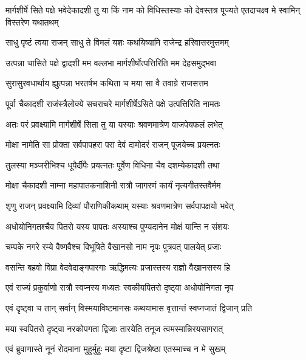 \threelineshloka
{मार्गशीर्षे सिते पक्षे भवेदेकादशी तु या}
{किं नाम को विधिस्तस्याः को देवस्तत्र पूज्यते}
{एतदाचक्ष्व मे स्वामिन् विस्तरेण यथातथम्}%


\twolineshloka
{साधु पृष्टं त्वया राजन् साधु ते विमलं यशः}
{कथयिष्यामि राजेन्द्र हरिवासरमुत्तमम्}%

\twolineshloka
{उत्पन्ना चासिते पक्षे द्वादशी मम वल्लभा}
{मार्गशीर्षोत्पत्तिरिति मम देहसमुद्भवा}%

\twolineshloka
{सुरासुरवधार्थाय ह्युत्पन्ना भरतर्षभ}
{कथिता च मया सा वै तवाग्रे राजसत्तम}%

\twolineshloka
{पूर्वा चैकादशी राजंस्त्रैलोक्ये सचराचरे}
{मार्गशीर्षेऽसिते पक्षे उत्पत्तिरिति नामतः}%

\twolineshloka
{अतः परं प्रवक्ष्यामि मार्गशीर्षे सिता तु या}
{यस्याः श्रवणमात्रेण वाजपेयफलं लभेत्}%

\twolineshloka
{मोक्षा नामेति सा प्रोक्ता सर्वपापहरा परा}
{देवं दामोदरं राजन् पूजयेच्च प्रयत्नतः}%

\twolineshloka
{तुलस्या मञ्जरीभिश्च धूपैर्दीपैः प्रयत्नतः}
{पूर्वेण विधिना चैव दशम्येकादशी तथा}%

\twolineshloka
{मोक्षा चैकादशी नाम्ना महापातकनाशिनी}
{रात्रौ जागरणं कार्यं नृत्यगीतस्तवैर्मम}%

\twolineshloka
{शृणु राजन् प्रवक्ष्यामि दिव्यां पौराणिकीकथाम्}
{यस्याः श्रवणमात्रेण सर्वपापक्षयो भवेत्}%

\twolineshloka
{अधोयोनिगतश्चैव पितरो यस्य पापतः}
{अस्याश्च पुण्यदानेन मोक्षं यान्ति न संशयः}%

\twolineshloka
{चम्पके नगरे रम्ये वैष्णवैश्च विभूषिते}
{वैखानसो नाम नृपः पुत्रवत् पालयेत् प्रजाः}%

\twolineshloka
{वसन्ति बहवो विप्रा वेदवेदाङ्गपारगाः}
{ऋद्धिमत्यः प्रजास्तस्य राज्ञो वैखानसस्य हि}%

\twolineshloka
{एवं राज्यं प्रकुर्वाणो रात्रौ स्वप्नस्य मध्यतः}
{स्वकीयपितरो दृष्ट्वा अधोयोनिगता नृप}%

\twolineshloka
{एवं दृष्ट्वा च तान् सर्वान् विस्मयाविष्टमानसः}
{कथयामास वृत्तान्तं स्वप्नजातं द्विजान् प्रति}%


\twolineshloka
{मया स्वपितरो दृष्ट्वा नरकोपगता द्विजाः}
{तारयेति तनूज त्वमस्मान्निरयसागरात्}%

\twolineshloka
{एवं ब्रुवाणास्ते नूनं रोदमाना मुहुर्मुहुः}
{मया दृष्टा द्विजश्रेष्ठा एतस्माच्च न मे सुखम्}%

